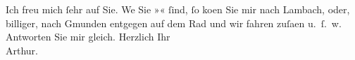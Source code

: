 \begin{ledgroupsized}[t]{13cm}
           \pstart
           Ich freu mich ſehr auf Sie. We{\geminationn}{ }{\pb}Sie »\textsc{}« ſind, ſo ko{\geminationm}en
               Sie mir nach Lambach, oder, billiger, nach Gmunden entgegen auf dem Rad und wir fahren zuſa{\geminationm}en u. ſ. w.\pend
           \pstart
           Antworten Sie mir gleich.\pend
           \pstart
           Herzlich Ihr{\\}\spacefill\mbox{Arthur.}\pend
           \endnumbering{}\end{ledgroupsized}  \newcommand{\dateiname}{L00685}\newcommand{\titel}{Arthur Schnitzler an Richard Beer-Hofmann, 12. 6. 1897}\newcommand{\editorInnen}{Martin Anton Müller und Gerd-Hermann Susen}
      
